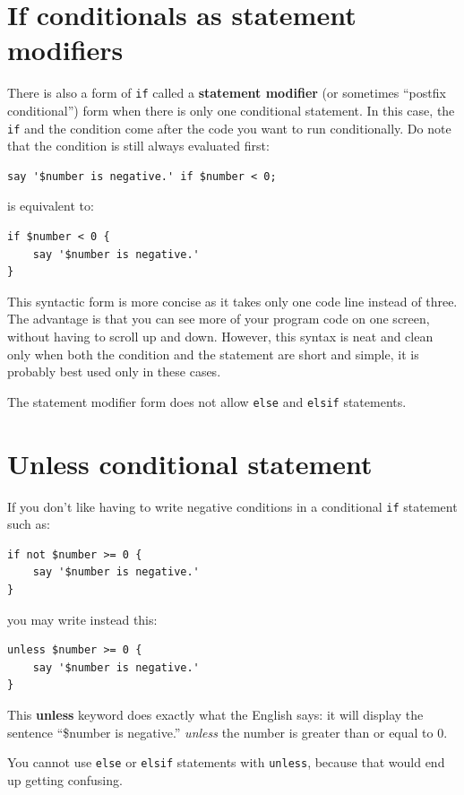 \section{If conditionals as statement modifiers}

There is also a form of {\tt if} called a {\bf statement 
modifier} (or sometimes  ``postfix conditional'') form when there is only 
one conditional statement. In this case, the {\tt if} and the 
condition come after the code you want to run conditionally. Do note 
that the condition is still always evaluated first:

\begin{verbatim}
say '$number is negative.' if $number < 0;
\end{verbatim}
%
is equivalent to:
\begin{verbatim}
if $number < 0 {
    say '$number is negative.' 
}
\end{verbatim}
%
This syntactic form is more concise as it takes only one code 
line instead of three. The advantage is that you can see more
of your program code on one screen, without having to scroll up 
and down. However, this syntax is neat and clean only when 
both the condition and the statement are short and simple, it 
is probably best used only in these cases.

The statement modifier form does not allow {\tt else} and
{\tt elsif} statements.

\section{Unless conditional statement}

If you don't like having to write negative conditions in a conditional
{\tt if} statement such as:
%
\begin{verbatim}
if not $number >= 0 {
    say '$number is negative.' 
}
\end{verbatim}
%

you may write instead this:
\begin{verbatim}
unless $number >= 0 {
    say '$number is negative.' 
}
\end{verbatim}
%
This {\bf unless} keyword does exactly what the English says: 
it will display the sentence ``\$number is negative.'' 
\emph{unless} the number is greater than or equal to 0.

You cannot use {\tt else} or {\tt elsif} statements with 
{\tt unless}, because that would end up getting confusing.

